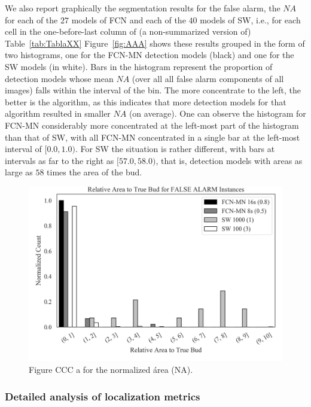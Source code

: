 \documentclass[a4paper,authoryear,review]{elsarticle}
\begin{document}
We also report graphically the segmentation results for the false alarm, the $NA$  for each of the $27$ models of FCN and each of the $40$ models of SW, i.e., for each cell in the  one-before-last column of (a non-summarized version of) Table~\ref{tab:TablaXX}
%
Figure~\ref{fig:AAA} shows these results grouped in the form of two histograms, one for the FCN-MN detection models (black) and one for the SW models (in white). Bars in the histogram represent the proportion of detection models whose mean $NA$ (over all all false alarm components of all images) falls within the interval of the bin. The more concentrate to the left, the better is the algorithm, as this indicates that more detection models for that algorithm resulted in smaller $NA$ (on average).
%
One can observe the histogram for FCN-MN considerably more concentrated at the left-most part of the histogram than that of SW, with all FCN-MN concentrated in a single bar at the left-most interval of  $[0.0, 1.0)$. For SW the situation is rather different, with bars at intervals as far to the right as $[57.0, 58.0)$, that is, detection models with areas as large as $58$ times the area of the bud. 
%
\begin{figure}%
	\centering
	\includegraphics[width=\textwidth]{figures/CCC_relative_area_false_alarm.png}
	\caption{Figure CCC a for the normalized área (NA).}%
	\label{fig:truebud-FA-a}
\end{figure}

\subsubsection{Detailed analysis of localization metrics}
\end{document}
